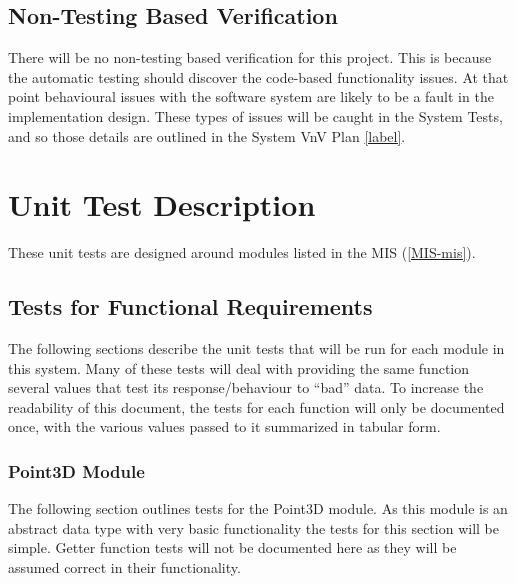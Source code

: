 \documentclass[12pt, titlepage]{article}
\begin{document}
\subsection{Non-Testing Based Verification}
There will be no non-testing based verification for this project. This is 
because the automatic testing should discover the code-based functionality 
issues. At that point behavioural issues with the software system are likely to 
be a fault in the implementation design. These types of issues will be caught 
in the System Tests, and so those details are outlined in the System VnV Plan 
\ref{label}.


\section{Unit Test Description}
These unit tests are designed around modules listed in the MIS (\ref{MIS-mis}).


\subsection{Tests for Functional Requirements}
The following sections describe the unit tests that will be run for each module 
in this system. Many of these tests will deal with providing the same function 
several values that test its response/behaviour to ``bad'' data. To increase 
the readability of this document, the tests for each function will only be 
documented once, with the various values passed to it summarized in tabular 
form.

\subsubsection{Point3D Module}
The following section outlines tests for the Point3D module. As this module is 
an abstract data type with very basic functionality the tests for this section 
will be simple. Getter function tests will not be documented here as they will 
be assumed correct in their functionality.
\end{document}
